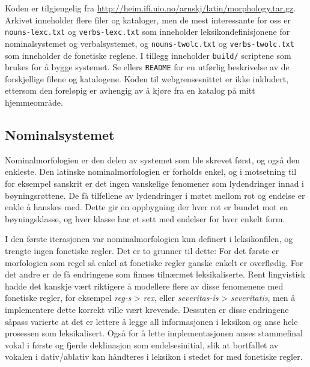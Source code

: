 \documentclass{article}
\newcommand\link[1]{\href{#1}{#1}}
\let\prog\texttt
\let\w\emph
\begin{document}
Koden er tilgjengelig fra
\link{http://heim.ifi.uio.no/arnskj/latin/morphology.tar.gz}. Arkivet
inneholder flere filer og kataloger, men de mest interessante for oss er
\prog{nouns-lexc.txt} og \prog{verbs-lexc.txt} som inneholder
leksikondefinisjonene for nominalsystemet og verbalsystemet, og
\prog{nouns-twolc.txt} og \prog{verbs-twolc.txt} som inneholder de fonetiske
reglene. I tillegg inneholder \prog{build/} scriptene som brukes for \aa{}
bygge systemet. Se ellers \prog{README} for en utf\o{}rlig beskrivelse av de
forskjellige filene og katalogene. Koden til webgrensesnittet er ikke
inkludert, ettersom den forel\o{}pig er avhengig av \aa{} kj\o{}re fra en
katalog p\aa{} mitt hjemmeomr\aa{}de.

\subsection{Nominalsystemet}
\label{deklinasjon}
Nominalmorfologien er den delen av systemet som ble skrevet f\o{}rst, og
ogs\aa{} den enkleste. Den latinske nominalmorfologien er forholds enkel, og i
motsetning til for eksempel sanskrit er det ingen vanskelige fenomener som
lydendringer innad i b\o{}yningsr\o{}ttene. De f\aa{} tilfellene av
lydendringer i m\o{}tet mellom rot og endelse er enkle \aa{} hanskes med.
Dette gir en oppbygning der hver rot er bundet mot en b\o{}yningsklasse, og
hver klasse har et sett med endelser for hver enkelt form.

I den f\o{}rste iterasjonen var nominalmorfologien kun definert i
leksikonfilen, og trengte ingen fonetiske regler. Det er to grunner til dette:
For det f\o{}rste er morfologien som regel s\aa{} enkel at fonetiske regler
ganske enkelt er overfl\o{}dig. For det andre er de f\aa{} endringene som
finnes tiln\ae{}rmet leksikaliserte. Rent lingvistisk hadde det kanskje
v\ae{}rt riktigere \aa{} modellere flere av disse fenomenene med fonetiske
regler, for eksempel \w{reg-s} > \w{rex}, eller \w{severitas-is} >
\w{severitatis}, men \aa{} implementere dette korrekt ville v\ae{}rt krevende.
Dessuten er disse endringene s\aa{}pass varierte at det er lettere \aa{} legge
all informasjonen i leksikon og anse hele prosessen som leksikalisert.
Ogs\aa{} for \aa{} lette implementasjonen anses stammefinal vokal i f\o{}rste
og fjerde deklinasjon som endelsesinitial, slik at bortfallet av vokalen i
dativ/ablativ kan h\aa{}ndteres i leksikon i stedet for med fonetiske regler.
\end{document}

